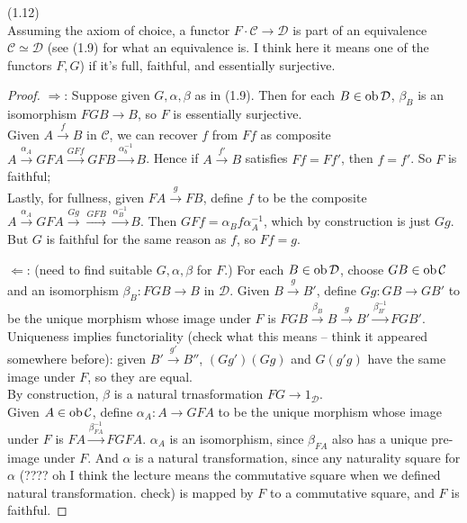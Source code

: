 \documentclass[a4paper]{article}
\begin{document}
\begin{lemma} (1.12)\\
    Assuming the axiom of choice, a functor $F \cdot \mathcal{C} \to \mathcal{D}$ is part of an equivalence $\mathcal{C} \simeq \mathcal{D}$ (see (1.9) for what an equivalence is. I think here it means one of the functors $F,G$) if it's full, faithful, and essentially surjective.
    \begin{proof}
        $\Rightarrow$: Suppose given $G,\alpha,\beta$ as in (1.9). Then for each $B \in \operatorname{ob}\mathcal{D}$, $\beta_B$ is an isomorphism $FGB \to B$, so $F$ is essentially surjective.\\
        Given $A \xrightarrow{f} B$ in $\mathcal{C}$, we can recover $f$ from $Ff$ as composite $A \xrightarrow{\alpha_A} GFA \xrightarrow{GFf} GFB \xrightarrow{\alpha_b^{-1}} B$. Hence if $A \xrightarrow{f'}B$ satisfies $Ff = Ff'$, then $f=f'$. So $F$ is faithful;\\
        Lastly, for fullness, given $FA \xrightarrow{g} FB$, define $f$ to be the composite $A \xrightarrow {\alpha_A} GFA \xrightarrow{Gg} \xrightarrow{GFB} \xrightarrow{\alpha_B^{-1}} B$. Then $GFf = \alpha_B f \alpha_A^{-1}$, which by construction is just $Gg$. But $G$ is faithful for the same reason as $f$, so $Ff = g$.

        $\Leftarrow$: (need to find suitable $G,\alpha,\beta$ for $F$.) For each $B \in \operatorname{ob} \mathcal{D}$, choose $GB \in \operatorname{ob} \mathcal{C}$ and an isomorphism $\beta_B : FGB \to B$ in $\mathcal{D}$. Given $B \xrightarrow{g} B'$, define $Gg:GB \to GB'$ to be the unique morphism whose image under $F$ is $FGB \xrightarrow{\beta_B} B \xrightarrow{g} B' \xrightarrow{\beta_{B'}^{-1}} FGB'$.\\
        Uniqueness implies functoriality (check what this means -- think it appeared somewhere before): given $B' \xrightarrow{g'} B''$, $(Gg')(Gg)$ and $G(g'g)$ have the same image under $F$, so they are equal.\\
        By construction, $\beta$ is a natural trnasformation $FG \to 1_\mathcal{D}$.\\
        Given $A \in \operatorname{ob} \mathcal{C}$, define $\alpha_A: A \to GFA$ to be the unique morphism whose image under $F$ is $FA \xrightarrow{\beta_{FA}^{-1}} FGFA$. $\alpha_A$ is an isomorphism, since $\beta_{FA}$ also has a unique pre-image under $F$. And $\alpha$ is a natural transformation, since any naturality square for $\alpha$ (???? oh I think the lecture means the commutative square when we defined natural transformation. check) is mapped by $F$ to a commutative square, and $F$ is faithful.
    \end{proof}
\end{lemma}
\end{document}
